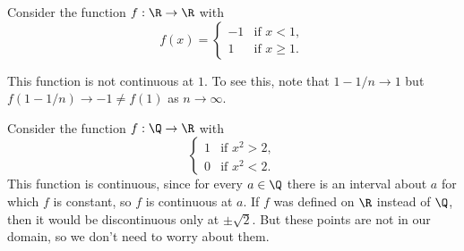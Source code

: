 \begin{example}
	Consider the function $f : \R \rightarrow \R$ with
	$$
	f(x) = \begin{cases}
        -1 &\mbox{if } x < 1, \\
        1 &\mbox{if } x \geq 1.
       \end{cases}
	$$
	\begin{center}
	\end{center}

	This function is not continuous at $1$. To see this, note that $1 - 1/n \rightarrow 1$ but $f(1 - 1/n) \rightarrow -1 \neq f(1)$ as $n \rightarrow \infty$.
\end{example}

\begin{example}
Consider the function $f: \Q \rightarrow \R$ with
$$
\begin{cases}
	1 &\mbox{if } x^2 > 2, \\
	0 &\mbox{if } x^2 < 2.
   \end{cases}
$$
This function is continuous, since for every $a \in \Q$ there is an interval about $a$ for which $f$ is constant, so $f$ is continuous at $a$. If $f$ was defined on $\R$ instead of $\Q$, then it would be discontinuous only at $\pm\sqrt{2}$. But these points are not in our domain, so we don't need to worry about them.
\end{example}


